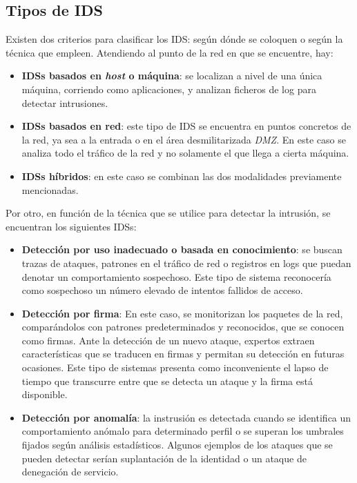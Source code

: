 \subsection{Tipos de IDS}
Existen dos criterios para clasificar los IDS: según dónde se coloquen o según la técnica que empleen. Atendiendo al punto de la red en que se encuentre, hay:
\begin{itemize}
	\item \textbf{IDSs basados en \textit{host} o máquina}: se localizan a nivel de una única máquina, corriendo como aplicaciones, y analizan ficheros de log para detectar intrusiones.
	\item \textbf{IDSs basados en red}: este tipo de IDS se encuentra en puntos concretos de la red, ya sea a la entrada o en el área desmilitarizada \textit{DMZ}. En este caso se analiza todo el tráfico de la red y no solamente el que llega a cierta máquina.
	\item \textbf{IDSs híbridos}: en este caso se combinan las dos modalidades previamente mencionadas.
\end{itemize}
Por otro, en función de la técnica que se utilice para detectar la intrusión, se encuentran los siguientes IDSs:
\begin{itemize}
	\item \textbf{Detección por uso inadecuado o basada en conocimiento}: se buscan trazas de ataques, patrones en el tráfico de red o registros en logs que puedan denotar un comportamiento sospechoso. Este tipo de sistema reconocería como sospechoso un número elevado de intentos fallidos de acceso.
	\item \textbf{Detección por firma}: En este caso, se monitorizan los paquetes de la red, comparándolos con patrones predeterminados y reconocidos, que se conocen como firmas. Ante la detección de un nuevo ataque, expertos extraen características que se traducen en firmas y permitan su detección en futuras ocasiones. Este tipo de sistemas presenta como inconveniente el lapso de tiempo que transcurre entre que se detecta un ataque y la firma está disponible.
	\item \textbf{Detección por anomalía}: la instrusión es detectada cuando se identifica un comportamiento anómalo para determinado perfil o se superan los umbrales fijados según análisis estadísticos. Algunos ejemplos de los ataques que se pueden detectar serían suplantación de la identidad o un ataque de denegación de servicio. 
\end{itemize}
\cite{Vuppala}
